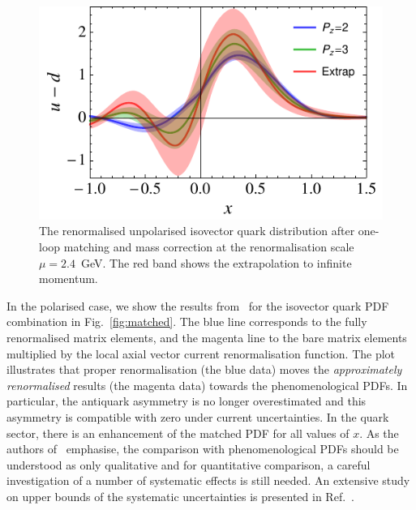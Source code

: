 \begin{figure}[!t]
\centering
\includegraphics[width=.6\textwidth]{plots/pdf_nonorm}
\caption{\small The renormalised unpolarised isovector quark distribution after 
one-loop matching and mass correction at the renormalisation scale 
$\mu=2.4$~GeV. 
The red band shows the extrapolation to infinite momentum. 
} \label{fig:final_pdf}
\end{figure}

In the polarised case, we show the results from~\cite{Alexandrou:2017huk} 
for the isovector quark PDF combination in Fig.~\ref{fig:matched}. 
%
The blue line corresponds to the fully renormalised matrix elements, and the 
magenta line to the bare matrix elements multiplied by the local axial vector 
current renormalisation function.
%
The plot illustrates that proper renormalisation (the blue data) moves the 
{\it approximately renormalised} results (the magenta data) towards the 
phenomenological PDFs. 
%
In particular, the antiquark asymmetry is no longer overestimated and this 
asymmetry is compatible with zero under current uncertainties. 
%
In the quark sector, there is an enhancement of the matched PDF for all 
values of $x$. 
%
As the authors of~\cite{Alexandrou:2017huk} emphasise, the comparison 
with phenomenological PDFs should be understood as only qualitative 
and for quantitative comparison, a careful investigation of a number of 
systematic effects is still needed. 
%
An extensive study on upper bounds of the systematic uncertainties is presented 
in Ref.~\cite{Alexandrou:2017huk}.

